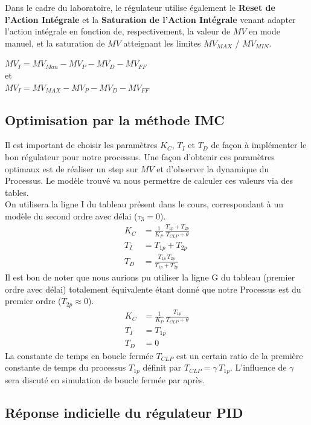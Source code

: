 Dans le cadre du laboratoire, le régulateur utilise également le \textbf{Reset de l'Action Intégrale} et la \textbf{Saturation de l'Action Intégrale} venant adapter l'action intégrale en fonction de, respectivement, la valeur de $MV$ en mode manuel, et la saturation de $MV$ atteignant les limites $MV_{MAX}$ / $MV_{MIN}$.
\begin{center}
    $MV_I = MV_{Man} - MV_P - MV_D - MV_{FF}$\\[4pt]
    et\\[4pt]
    $MV_I = MV_{MAX} - MV_P - MV_D - MV_{FF}$
\end{center}

\subsection{Optimisation par la méthode IMC}
Il est important de choisir les paramètres $K_C$, $T_I$ et $T_D$ de façon à implémenter le bon régulateur pour notre processus.
Une façon d'obtenir ces paramètres optimaux est de réaliser un step sur $MV$ et d'observer la dynamique du Processus.
Le modèle trouvé va nous permettre de calculer ces valeurs via des tables.\\
On utilisera la ligne I du tableau présent dans le cours, correspondant à un modèle du second ordre avec délai ($\tau_3 = 0$).
\begin{align*}
    K_C &= \frac{1}{K_P} \, \frac{T_{1p} + T_{2p}}{T_{CLP} + \theta}\\[4pt]
    T_I &= T_{1p} + T_{2p}\\[4pt]
    T_D &= \frac{T_{1p} \, T_{2p}}{T_{1p} + T_{2p}}
\end{align*}
Il est bon de noter que nous aurions pu utiliser la ligne G du tableau (premier ordre avec délai) totalement équivalente étant donné que notre Processus est du premier ordre ($T_{2p} \approx 0$).
\begin{align*}
    K_C &= \frac{1}{K_P} \, \frac{T_{1p}}{T_{CLP} + \theta}\\[4pt]
    T_I &= T_{1p}\\[4pt]
    T_D &= 0
\end{align*}
La constante de temps en boucle fermée $T_{CLP}$ est un certain ratio de la première constante de temps du processus $T_{1p}$ définit par $T_{CLP} = \gamma \, T_{1p}$. L'influence de $\gamma$ sera discuté en simulation de boucle fermée par après.

\subsection{Réponse indicielle du régulateur PID}

